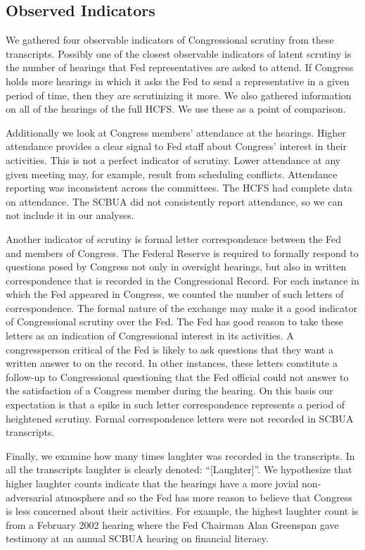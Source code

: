 \documentclass[a4paper]{article}\usepackage[]{graphicx}\usepackage[]{color}
\begin{document}
\subsection{Observed Indicators}

We gathered four observable indicators of Congressional scrutiny from these transcripts. Possibly one of the closest observable indicators of latent scrutiny is the number of hearings that Fed representatives are asked to attend. If Congress holds more hearings in which it asks the Fed to send a representative in a given period of time, then they are scrutinizing it more. We also gathered information on all of the hearings of the full HCFS. We use these as a point of comparison.

Additionally we look at Congress members' attendance at the hearings. Higher attendance provides a clear signal to Fed staff about Congress' interest in their activities. This is not a perfect indicator of scrutiny. Lower attendance at any given meeting may, for example, result from scheduling conflicts. Attendance reporting was inconsistent across the committees. The HCFS had complete data on attendance. The SCBUA did not consistently report attendance, so we can not include it in our analyses.

Another indicator of scrutiny is formal letter correspondence between the Fed and members of Congress. The Federal Reserve is required to formally respond to questions posed by Congress not only in oversight hearings, but also in written correspondence that is recorded  in the Congressional Record. For each instance in which the Fed appeared in Congress, we counted the number of such letters of correspondence. The formal nature of the exchange may make it a good indicator of Congressional scrutiny over the Fed. The Fed has good reason to take these letters as an indication of Congressional interest in its activities. A congressperson critical of the Fed is likely to ask questions that they want a written answer to on the record. In other instances, these letters constitute a follow-up to Congressional questioning that the Fed official could not answer to the satisfaction of a Congress member during the hearing. On this basis our expectation is that a spike in such letter correspondence represents a period of heightened scrutiny. Formal correspondence letters were not recorded in SCBUA transcripts.

Finally, we examine how many times laughter was recorded in the transcripts. In all the transcripts laughter is clearly denoted: ``[Laughter]''. We hypothesize that higher laughter counts indicate that the hearings have a more jovial non-adversarial atmosphere and so the Fed has more reason to believe that Congress is less concerned about their activities. For example, the highest laughter count is from a February 2002 hearing where the Fed Chairman Alan Greenspan gave testimony at an annual SCBUA hearing on financial literacy.
\end{document}
